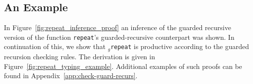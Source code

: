 
\subsection{An Example}
In Figure~\ref{fig:repeat_inference_proof} an inference of the guarded recursive
version of the function \texttt{repeat}'s guarded-recursive counterpart was shown. In continuation of this, we
show that $_g$\texttt{repeat} is productive according to the guarded recursion
checking rules. The derivation is given in Figure~\ref{fig:repeat_typing_example}. Additional examples of such proofs can be found in Appendix~\ref{app:check-guard-recurs}.


